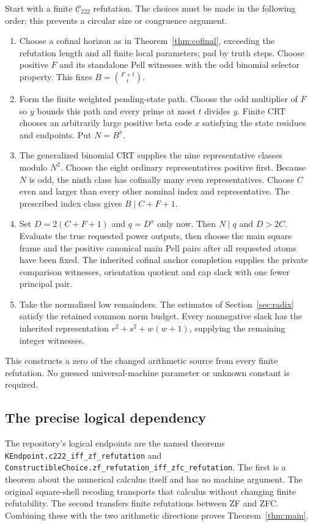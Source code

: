 \documentclass[11pt,a4paper]{article}
\theoremstyle{remark}\newtheorem{remark}[theorem]{Remark}
\newcommand{\Ccal}{\mathcal C_{222}}
\begin{document}
Start with a finite $\Ccal$ refutation. The choices must be made in the
following order; this prevents a circular size or congruence argument.
\begin{enumerate}[leftmargin=*,itemsep=0.35em]
\item Choose a cofinal horizon as in Theorem~\ref{thm:cofinal}, exceeding
the refutation length and all finite local parameters; pad by truth steps.
Choose positive $F$ and its standalone Pell witnesses with the odd binomial
selector property. This fixes $B=\binom{F+t}{t}$.
\item Form the finite weighted pending-state path. Choose the odd multiplier
of $F$ so $y$ bounds this path and every prime at most $t$ divides $y$.
Finite CRT chooses an arbitrarily large positive beta code $x$ satisfying the
state residues and endpoints. Put $N=B^x$.
\item The generalized binomial CRT supplies the nine representative classes
modulo $N^2$. Choose the eight ordinary representatives positive first.
Because $N$ is odd, the ninth class has cofinally many even representatives.
Choose $C$ even and larger than every other nominal index and representative.
The prescribed index class gives $B\mid C+F+1$.
\item Set $D=2(C+F+1)$ and $q=D^x$ only now. Then $N\mid q$ and $D>2C$.
Evaluate the true requested power outputs, then choose the main square frame
and the positive canonical main Pell pairs after all requested atoms have
been fixed. The inherited cofinal anchor
completion supplies the private comparison witnesses, orientation quotient
and cap slack with one fewer principal pair.
\item Take the normalized low remainders. The estimates of
Section~\ref{sec:radix} satisfy the retained common norm budget. Every
nonnegative slack has the inherited representation
$r^2+s^2+w(w+1)$, supplying the remaining integer witnesses.
\end{enumerate}
This constructs a zero of the changed arithmetic source from every finite
refutation. No guessed universal-machine parameter or unknown constant is
required.

\subsection{The precise logical dependency}

The repository's logical endpoints are the named theorems
\texttt{KEndpoint.c222\_iff\_zf\_refutation} and
\texttt{ConstructibleChoice.zf\_refutation\_iff\_zfc\_refutation}.
The first is a theorem about the numerical calculus itself and has no machine
argument. The original square-shell recoding transports that calculus without
changing finite refutability. The second transfers finite refutations between
ZF and ZFC. Combining these with the two arithmetic directions proves
Theorem~\ref{thm:main}.
\end{document}
